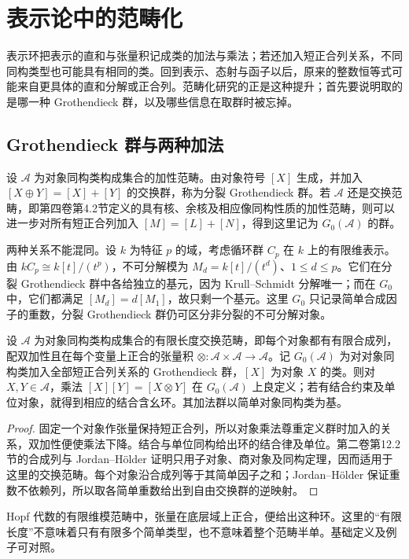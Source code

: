 %
%
\section{表示论中的范畴化}
\label{b5:sec:B03}

表示环把表示的直和与张量积记成类的加法与乘法；若还加入短正合列关系，不同同构类型也可能具有相同的类。回到表示、态射与函子以后，原来的整数恒等式可能来自更具体的直和分解或正合列。范畴化研究的正是这种提升；首先要说明取的是哪一种 Grothendieck 群，以及哪些信息在取群时被忘掉。

\subsection{Grothendieck 群与两种加法}
\label{b5:subsec:B03:01}

设 \(\mathcal A\) 为对象同构类构成集合的加性范畴。由对象符号 \([X]\) 生成，并加入 \([X\oplus Y]=[X]+[Y]\) 的交换群，称为分裂 Grothendieck 群。若 \(\mathcal A\) 还是交换范畴，即第四卷第4.2节定义的具有核、余核及相应像同构性质的加性范畴，则可以进一步对所有短正合列加入 \([M]=[L]+[N]\)，得到这里记为 \(G_0(\mathcal A)\) 的群。

\ProseParagraphBreak
两种关系不能混同。设 \(k\) 为特征 \(p\) 的域，考虑循环群 \(C_p\) 在 \(k\) 上的有限维表示。由 \(kC_p\cong k[t]/(t^p)\)，不可分解模为 \(M_d=k[t]/(t^d)\)、\(1\le d\le p\)。它们在分裂 Grothendieck 群中各给独立的基元，因为 Krull--Schmidt 分解唯一；而在 \(G_0\) 中，它们都满足 \([M_d]=d[M_1]\)，故只剩一个基元。这里 \(G_0\) 只记录简单合成因子的重数，分裂 Grothendieck 群仍可区分非分裂的不可分解对象。
\begin{proposition}\label{b5:prop:B-tensor-grothendieck}
	设 \(\mathcal A\) 为对象同构类构成集合的有限长度交换范畴，即每个对象都有有限合成列，配双加性且在每个变量上正合的张量积 \(\otimes:\mathcal A\times\mathcal A\to\mathcal A\)。记 \(G_0(\mathcal A)\) 为对对象同构类加入全部短正合列关系的 Grothendieck 群，\([X]\) 为对象 \(X\) 的类。则对 \(X,Y\in\mathcal A\)，乘法 \([X][Y]=[X\otimes Y]\) 在 \(G_0(\mathcal A)\) 上良定义；若有结合约束及单位对象，就得到相应的结合含幺环。其加法群以简单对象同构类为基。
\end{proposition}
\begin{proof}
	固定一个对象作张量保持短正合列，所以对象乘法尊重定义群时加入的关系，双加性便使乘法下降。结合与单位同构给出环的结合律及单位。第二卷第12.2节的合成列与 Jordan--Hölder 证明只用子对象、商对象及同构定理，因而适用于这里的交换范畴。每个对象沿合成列等于其简单因子之和；Jordan--Hölder 保证重数不依赖列，所以取各简单重数给出到自由交换群的逆映射。
\end{proof}
Hopf 代数的有限维模范畴中，张量在底层域上正合，便给出这种环。这里的“有限长度”不意味着只有有限多个简单类型，也不意味着整个范畴半单。基础定义及例子可对照\cite[Definition 1.5.8; Section 4.5]{EtingofEtAl2015TensorCategories}。

